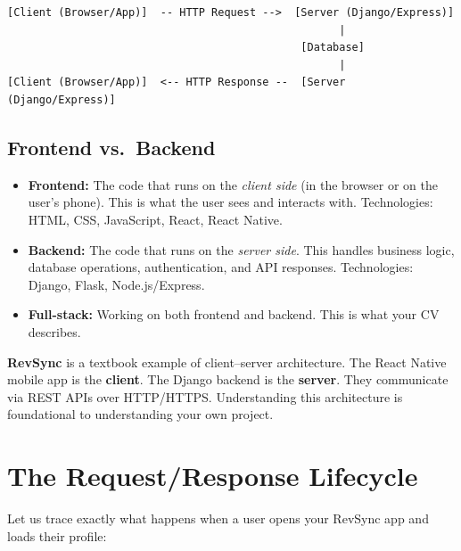 \documentclass[12pt, a4paper, oneside]{book}
\begin{document}
\begin{verbatim}
[Client (Browser/App)]  -- HTTP Request -->  [Server (Django/Express)]
                                                    |
                                              [Database]
                                                    |
[Client (Browser/App)]  <-- HTTP Response --  [Server (Django/Express)]
\end{verbatim}

\subsection{Frontend vs.\ Backend}

\begin{itemize}[leftmargin=2em]
    \item \textbf{Frontend:} The code that runs on the \emph{client side} (in the browser or on the user's phone). This is what the user sees and interacts with. Technologies: HTML, CSS, JavaScript, React, React Native.
    \item \textbf{Backend:} The code that runs on the \emph{server side}. This handles business logic, database operations, authentication, and API responses. Technologies: Django, Flask, Node.js/Express.
    \item \textbf{Full-stack:} Working on both frontend and backend. This is what your CV describes.
\end{itemize}

\begin{projectbox}
\textbf{RevSync} is a textbook example of client--server architecture. The React Native mobile app is the \textbf{client}. The Django backend is the \textbf{server}. They communicate via REST APIs over HTTP/HTTPS. Understanding this architecture is foundational to understanding your own project.
\end{projectbox}

\section{The Request/Response Lifecycle}

Let us trace exactly what happens when a user opens your RevSync app and loads their profile:
\end{document}
